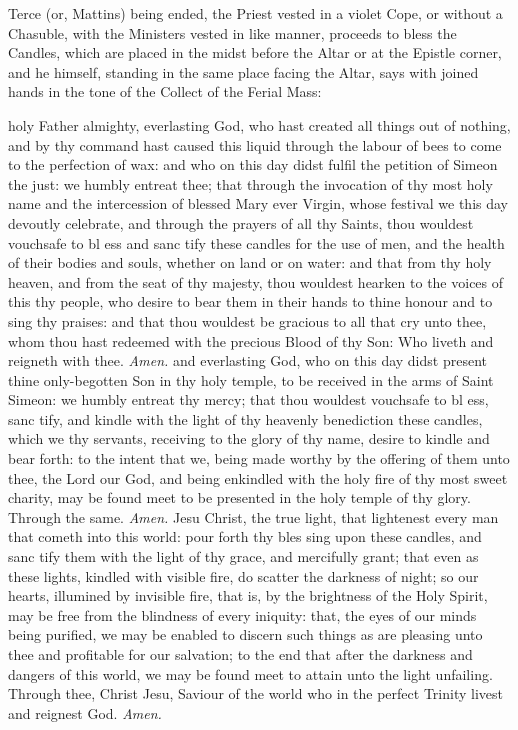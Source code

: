 \begin{rubric}
    Terce (or, Mattins) being ended, the Priest vested in a violet Cope, or without a Chasuble, with the Ministers vested in like manner, proceeds to bless the Candles, which are placed in the midst before the Altar or at the Epistle corner, and he himself, standing in the same place facing the Altar, says with joined hands in the tone of the Collect of the Ferial Mass:
\end{rubric}
{} holy Father almighty, everlasting God, who hast created all things out of nothing, and by thy command hast caused this liquid through the labour of bees to come to the perfection of wax: and who on this day didst fulfil the petition of Simeon the just: we humbly entreat thee; that through the invocation of thy most holy name and the intercession of blessed Mary ever Virgin, whose festival we this day devoutly celebrate, and through the prayers of all thy Saints, thou wouldest vouchsafe to bl {} ess and sanc {} tify these candles for the use of men, and the health of their bodies and souls, whether on land or on water: and that from thy holy heaven, and from the seat of thy majesty, thou wouldest hearken to the voices of this thy people, who desire to bear them in their hands to thine honour and to sing thy praises: and that thou wouldest be gracious to all that cry unto thee, whom thou hast redeemed with the precious Blood of thy Son: Who liveth and reigneth with thee. \textit{Amen.}
{} and everlasting God, who on this day didst present thine only-begotten Son in thy holy temple, to be received in the arms of Saint Simeon: we humbly entreat thy mercy; that thou wouldest vouchsafe to bl {} ess, sanc {} tify, and kindle with the light of thy heavenly benediction these candles, which we thy servants, receiving to the glory of thy name, desire to kindle and bear forth: to the intent that we, being made worthy by the offering of them unto thee, the Lord our God, and being enkindled with the holy fire of thy most sweet charity, may be found meet to be presented in the holy temple of thy glory. Through the same. \textit{Amen.}
{} Jesu Christ, the true light, that lightenest every man that cometh into this world: pour forth thy bles {} sing upon these candles, and sanc {} tify them with the light of thy grace, and mercifully grant; that even as these lights, kindled with visible fire, do scatter the darkness of night; so our hearts, illumined by invisible fire, that is, by the brightness of the Holy Spirit, may be free from the blindness of every iniquity: that, the eyes of our minds being purified, we may be enabled to discern such things as are pleasing unto thee and profitable for our salvation; to the end that after the darkness and dangers of this world, we may be found meet to attain unto the light unfailing. Through thee, Christ Jesu, Saviour of the world who in the perfect Trinity livest and reignest God. \textit{Amen.}
